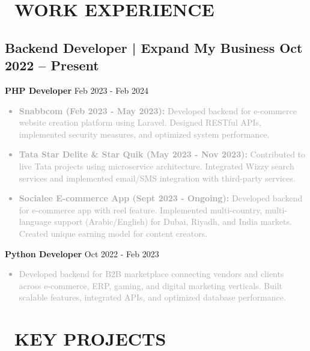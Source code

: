 \documentclass[10pt,a4paper]{article}
\begin{document}
\begin{paracol}{2}
\begin{rightcolumn}
\vspace{3mm}
\section*{\faBuilding\ WORK EXPERIENCE}

\subsection*{Backend Developer | Expand My Business \hfill \textcolor{primaryblue}{Oct 2022 – Present}}

\textbf{\color{darkblue}PHP Developer} \hfill \textcolor{mediumgray}{Feb 2023 - Feb 2024}
\textcolor{darkgray}{
\begin{itemize}
    \item \textbf{Snabbcom (Feb 2023 - May 2023):} Developed backend for e-commerce website creation platform using Laravel. Designed RESTful APIs, implemented security measures, and optimized system performance.
    
    \item \textbf{Tata Star Delite \& Star Quik (May 2023 - Nov 2023):} Contributed to live Tata projects using microservice architecture. Integrated Wizzy search services and implemented email/SMS integration with third-party services.
    
    \item \textbf{Socialee E-commerce App (Sept 2023 - Ongoing):} Developed backend for e-commerce app with reel feature. Implemented multi-country, multi-language support (Arabic/English) for Dubai, Riyadh, and India markets. Created unique earning model for content creators.
\end{itemize}
}

\textbf{\color{darkblue}Python Developer} \hfill \textcolor{mediumgray}{Oct 2022 - Feb 2023}
\textcolor{darkgray}{
\begin{itemize}
    \item Developed backend for B2B marketplace connecting vendors and clients across e-commerce, ERP, gaming, and digital marketing verticals. Built scalable features, integrated APIs, and optimized database performance.
\end{itemize}
}

\vspace{3mm}
\section*{\faCode\ KEY PROJECTS}


\end{rightcolumn}
\end{paracol}
\end{document}
